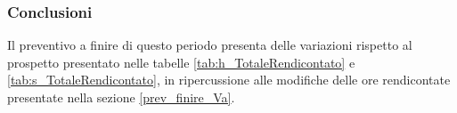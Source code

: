 		\subsubsection{Conclusioni} Il preventivo a finire di questo periodo presenta delle variazioni rispetto al prospetto presentato nelle tabelle \ref{tab:h_TotaleRendicontato} e \ref{tab:s_TotaleRendicontato}, in ripercussione alle modifiche delle ore rendicontate presentate nella sezione \ref{prev_finire_Va}. 
